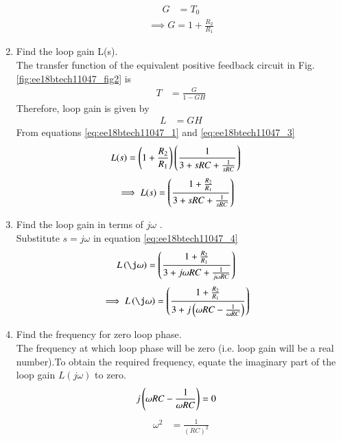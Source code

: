 \begin{enumerate}[label=\arabic*.,ref=\theenumi]
\begin{align}
G &= T_{0}
\end{align}
\begin{align}
\label{eq:ee18btech11047_1}
\implies G = 1 + \frac{R_{2}}{R_{1}}
\end{align}
%
%
\item Find the loop gain L(s).\\
\solution The transfer function of the equivalent positive feedback circuit in Fig. \ref{fig:ee18btech11047_fig2} is  
\begin{align}
T &= \frac{G}{1-GH}
\label{eq:ee18btech11047_TF}
\end{align}
Therefore, loop gain is given by 
\begin{align}
L &= GH
\end{align}
From equations \eqref{eq:ee18btech11047_1} and \eqref{eq:ee18btech11047_3}
\begin{align}
L(s) &= \left(1 + \frac{R_{2}}{R_{1}}\right)\left(\frac{1}{3+sRC+\frac{1}{sRC}}\right)
\end{align}
\begin{align}
\label{eq:ee18btech11047_4}
\implies L(s) &= \brak{\frac{1+\frac{R_{2}}{R_{1}}}{3+sRC+\frac{1}{sRC}}}
\end{align}
%
\item Find the loop gain in terms of $j\omega$ .\\
\solution Substitute $s = j\omega$ in equation \eqref{eq:ee18btech11047_4}
\begin{align} 
L\brak{\j\omega}&= \brak{\frac{1+\frac{R_{2}}{R_{1}}}{3+j\omega RC+\frac{1}{j\omega RC}}}
\end{align}
\begin{align}
\label{eq:ee18btech11047_5}
\implies L\brak{\j\omega}&= \brak{\frac{1+\frac{R_{2}}{R_{1}}}{3+ j \brak{\omega RC-\frac{1}{\omega RC}}}}
\end{align}
\item Find the frequency for zero loop phase.\\
\solution The frequency at which loop phase will be zero (i.e. loop gain will be a real number).To obtain the required frequency, equate the imaginary part of the loop gain $L(j \omega )$ to zero.
\begin{align}
j\left(\omega RC - \frac{1}{\omega RC}\right) &= 0
\end{align}
\begin{align}
\omega^{2} &= \frac{1}{(RC)^{2}}
\end{align}
\begin{align}

\end{align}
\end{enumerate}
